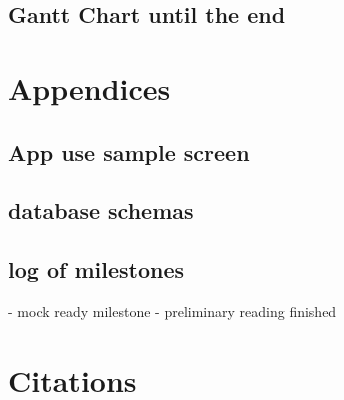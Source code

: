 \documentclass{article}
\begin{document}
\subsection{Gantt Chart until the end}

\section{Appendices}
\subsection{App use sample screen}

\subsection{database schemas}

\subsection{log of milestones}
- mock ready milestone 
- preliminary reading finished

\section{Citations}
\newpage
\end{document}
